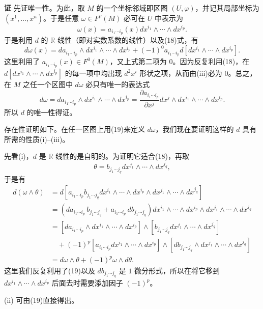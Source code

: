 \noindent\textbf{证}
先证唯一性。为此，取 $M$ 的一个坐标邻域即区图 $(U,\varphi)$，并记其局部坐标为 $(x^1,\ldots,x^n)$。于是任意 $\omega\in F^p(M)$ 必可在 $U$ 中表示为
\[
 \omega(x)=a_{i_1\cdots i_p}(x)dx^{i_1}\wedge\cdots\wedge dx^{i_p}.
\]
于是利用 $d$ 的 $\mathbb R$ 线性（即对实数系数的线性）以及(18)式，有
\[
 d\omega(x)=da_{i_1\cdots i_p}\wedge dx^{i_1}\wedge\cdots\wedge dx^{i_p}
 +(-1)^0 a_{i_1\cdots i_p}
 d[dx^{i_1}\wedge\cdots\wedge dx^{i_p}].
\]
这里利用了 $a_{i_1\cdots i_p}(x)\in F^0(M)$，又上式第二项为 $0$。因为反复利用(18)，在 $d[dx^{i_1}\wedge\cdots\wedge dx^{i_p}]$ 的每一项中均出现 $d^2x^i$ 形状之项，从而由(iii)必为 $0$。总之，在 $M$ 之任一个区图中 $d\omega$ 必只有唯一的表达式
\begin{equation}
 d\omega=da_{i_1\cdots i_p}\wedge dx^{i_1}\wedge\cdots\wedge dx^{i_p}
 =\frac{\partial a_{i_1\cdots i_p}}{\partial x^j}
 dx^j\wedge dx^{i_1}\wedge\cdots\wedge dx^{i_p}.
 \tag{19}
\end{equation}
所以 $d$ 的唯一性得证。

存在性证明如下。在任一区图上用(19)来定义 $d\omega$，我们现在要证明这样的 $d$ 具有所需的性质(i)--(iii)。

先看(i)，$d$ 是 $\mathbb R$ 线性的是自明的。为证明它适合(18)，再取
\[
 \theta=b_{j_1\cdots j_q}dx^{j_1}\wedge\cdots\wedge dx^{j_q},
\]
于是有
\begin{align*}
 d(\omega\wedge\theta)
 &=d[a_{i_1\cdots i_p}b_{j_1\cdots j_q}
 dx^{i_1}\wedge\cdots\wedge dx^{i_p}\wedge dx^{j_1}\wedge\cdots\wedge dx^{j_q}]\\
 &=(da_{i_1\cdots i_p}\,b_{j_1\cdots j_q}+a_{i_1\cdots i_p}\,db_{j_1\cdots j_q})
 dx^{i_1}\wedge\cdots\wedge dx^{i_p}\wedge dx^{j_1}\wedge\cdots\wedge dx^{j_q}\\
 &=[da_{i_1\cdots i_p}\wedge dx^{i_1}\wedge\cdots\wedge dx^{i_p}]
   \wedge[b_{j_1\cdots j_q}dx^{j_1}\wedge\cdots\wedge dx^{j_q}]\\
 &\quad+(-1)^p[a_{i_1\cdots i_p}dx^{i_1}\wedge\cdots\wedge dx^{i_p}]
   \wedge[db_{j_1\cdots j_q}\wedge dx^{j_1}\wedge\cdots\wedge dx^{j_q}]\\
 &=d\omega\wedge\theta+(-1)^p\omega\wedge d\theta.
\end{align*}
这里我们反复利用了(19)以及 $db_{j_1\cdots j_q}$ 是 $1$ 微分形式，所以在将它移到 $dx^{i_1}\wedge\cdots\wedge dx^{i_p}$ 后面去时需要添加因子 $(-1)^p$。

(ii) 可由(19)直接得出。

